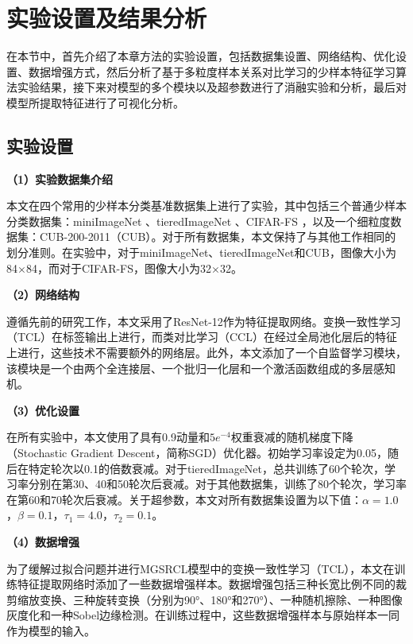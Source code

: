 \section[\hspace{-2pt}实验设置及结果分析]{{\heiti{} \hspace{-8pt}实验设置及结果分析}}\label{section3: 实验设置及结果分析}
在本节中，首先介绍了本章方法的实验设置，包括数据集设置、网络结构、优化设置、数据增强方式，然后分析了基于多粒度样本关系对比学习的少样本特征学习算法实验结果，接下来对模型的多个模块以及超参数进行了消融实验和分析，最后对模型所提取特征进行了可视化分析。

\subsection[\hspace{-2pt}实验设置]{{\heiti{} \hspace{-8pt}实验设置}}\label{section3: 实验设置}

\textbf{（1）实验数据集介绍}

本文在四个常用的少样本分类基准数据集上进行了实验，其中包括三个普通少样本分类数据集：miniImageNet \cite{vinyals2016matching}、tieredImageNet \cite{ren2018meta}、CIFAR-FS \cite{bertinetto2019meta}，以及一个细粒度数据集：CUB-200-2011（CUB）\cite{wah2011caltech}。对于所有数据集，本文保持了与其他工作\cite{RFS, RENet, IER}相同的划分准则。在实验中，对于miniImageNet、tieredImageNet和CUB，图像大小为84$\times$84，而对于CIFAR-FS，图像大小为32$\times$32。

\textbf{（2）网络结构}

遵循先前的研究工作\cite{RFS, DeepEMD, IER}，本文采用了ResNet-12作为特征提取网络。变换一致性学习（TCL）在标签输出上进行，而类对比学习（CCL）在经过全局池化层后的特征上进行，这些技术不需要额外的网络层。此外，本文添加了一个自监督学习模块，该模块是一个由两个全连接层、一个批归一化层和一个激活函数组成的多层感知机。

\textbf{（3）优化设置}

在所有实验中，本文使用了具有0.9动量和$5e^{-4}$权重衰减的随机梯度下降（Stochastic Gradient Descent，简称SGD）优化器。初始学习率设定为0.05，随后在特定轮次以0.1的倍数衰减。对于tieredImageNet，总共训练了60个轮次，学习率分别在第30、40和50轮次后衰减。对于其他数据集，训练了80个轮次，学习率在第60和70轮次后衰减。关于超参数，本文对所有数据集设置为以下值：$\alpha=1.0$，$\beta=0.1$，$\tau_1=4.0$，$\tau_2=0.1$。

\textbf{（4）数据增强}

为了缓解过拟合问题并进行MGSRCL模型中的变换一致性学习（TCL），本文在训练特征提取网络时添加了一些数据增强样本。数据增强包括三种长宽比例不同的裁剪缩放变换、三种旋转变换（分别为90°、180°和270°）、一种随机擦除、一种图像灰度化和一种Sobel边缘检测。在训练过程中，这些数据增强样本与原始样本一同作为模型的输入。

